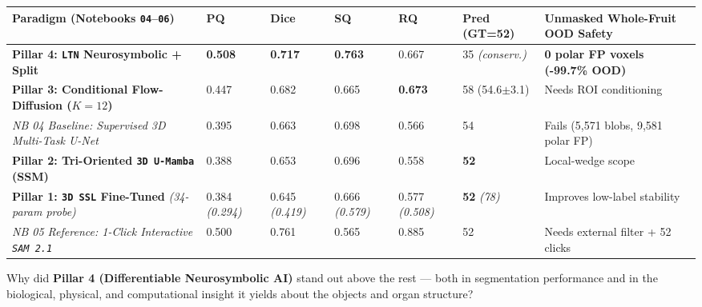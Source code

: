 \documentclass[10pt,a4paper]{article}
\begin{document}
{\footnotesize
\renewcommand{\arraystretch}{1.24}
\begin{tabularx}{\textwidth}{L{4.95cm} C{0.9cm} C{0.9cm} C{0.95cm} C{0.95cm} C{1.75cm} Y}
\toprule
{}\textbf{Paradigm (Notebooks \texttt{04}--\texttt{06})} & \textbf{PQ} & \textbf{Dice} & \textbf{SQ} & \textbf{RQ} & \textbf{Pred (GT=52)} & \textbf{Unmasked Whole-Fruit OOD Safety} \\
\midrule
\textbf{Pillar 4: \texttt{LTN} Neurosymbolic + Split} & \textbf{0.508} & \textbf{0.717} & \textbf{0.763} & 0.667 & 35 \textit{(conserv.)} & \textbf{0 polar FP voxels (-99.7\% OOD)} \\
\textbf{Pillar 3: Conditional Flow-Diffusion ($K{=}12$)} & 0.447 & 0.682 & 0.665 & \textbf{0.673} & 58 (54.6$\pm$3.1) & Needs ROI conditioning \\
\textit{NB 04 Baseline: Supervised 3D Multi-Task U-Net} & 0.395 & 0.663 & 0.698 & 0.566 & 54 & Fails (5,571 blobs, 9,581 polar FP) \\
\textbf{Pillar 2: Tri-Oriented \texttt{3D U-Mamba} (SSM)} & 0.388 & 0.653 & 0.696 & 0.558 & \textbf{52} & Local-wedge scope \\
\textbf{Pillar 1: \texttt{3D SSL} Fine-Tuned} \textit{(34-param probe)} & 0.384 \textit{(0.294)} & 0.645 \textit{(0.419)} & 0.666 \textit{(0.579)} & 0.577 \textit{(0.508)} & \textbf{52} \textit{(78)} & Improves low-label stability \\
\textit{NB 05 Reference: 1-Click Interactive \texttt{SAM 2.1}} & 0.500 & 0.761 & 0.565 & 0.885 & 52 & Needs external filter + 52 clicks \\
\bottomrule
\end{tabularx}
}

Why did \textbf{Pillar 4 (Differentiable Neurosymbolic AI)} stand out above the rest --- both in segmentation performance and in the biological, physical, and computational insight it yields about the objects and organ structure?
\end{document}
